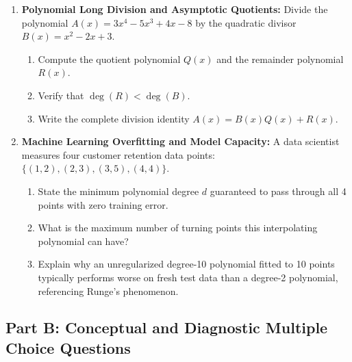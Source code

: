 \begin{enumerate}
    \item \textbf{Polynomial Long Division and Asymptotic Quotients:} Divide the polynomial $A(x) = 3x^4 - 5x^3 + 4x - 8$ by the quadratic divisor $B(x) = x^2 - 2x + 3$.
    \begin{enumerate}
        \item Compute the quotient polynomial $Q(x)$ and the remainder polynomial $R(x)$.
        \item Verify that $\deg(R) < \deg(B)$.
        \item Write the complete division identity $A(x) = B(x)Q(x) + R(x)$.
    \end{enumerate}

    \item \textbf{Machine Learning Overfitting and Model Capacity:} A data scientist measures four customer retention data points: $\{(1, 2), (2, 3), (3, 5), (4, 4)\}$.
    \begin{enumerate}
        \item State the minimum polynomial degree $d$ guaranteed to pass through all 4 points with zero training error.
        \item What is the maximum number of turning points this interpolating polynomial can have?
        \item Explain why an unregularized degree-10 polynomial fitted to 10 points typically performs worse on fresh test data than a degree-2 polynomial, referencing Runge's phenomenon.
    \end{enumerate}
\end{enumerate}

\subsection*{Part B: Conceptual and Diagnostic Multiple Choice Questions}

